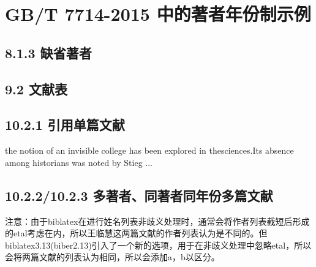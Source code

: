 \documentclass{article}
\begin{document}
\section*{GB/T 7714-2015 中的著者年份制示例}

\subsection*{8.1.3 缺省著者}
\begin{refsection}
\nocite{anon1981-628}
\printbibliography[heading=subbibliography]
\end{refsection}

\subsection*{9.2 文献表}
\begin{refsection}

\nocite{尼葛洛庞帝1996--,汪冰1997-16-16,杨宗英1996-24-29,Baker1995--,Chernik1982--,Dowler1995-5-26}

\printbibliography[heading=subbibliography]
\end{refsection}

\subsection*{10.2.1 引用单篇文献}
\begin{refsection}

the notion of an invisible college has been explored in thesciences\cite{CRANE1972--}.Its absence among historians was noted by Stieg ...

\printbibliography[heading=subbibliography]
\end{refsection}



\subsection*{10.2.2/10.2.3 多著者、同著者同年份多篇文献}
\begin{refsection}

\nocite{王临慧2010-147,王临慧2010-138}
\nocite{KENNEDY1975-311-386,KENNEDY1975-339-360}


\printbibliography[heading=subbibliography]

注意：由于biblatex在进行姓名列表非歧义处理时，通常会将作者列表截短后形成的etal考虑在内，所以王临慧这两篇文献的作者列表认为是不同的。但biblatex3.13(biber2.13)引入了一个新的选项，用于在非歧义处理中忽略etal，所以会将两篇文献的列表认为相同，所以会添加a，b以区分。
\end{refsection}
\end{document}
